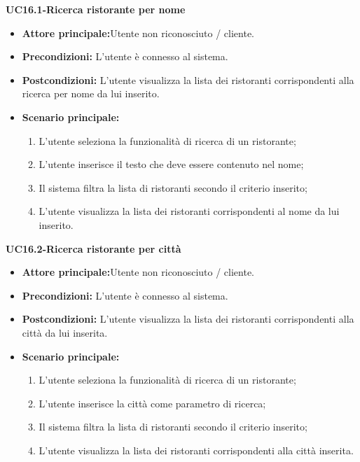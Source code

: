 \textbf{UC16.1-Ricerca ristorante per nome}
\begin{itemize}
\item \textbf{Attore principale:}Utente non riconosciuto / cliente.
\item \textbf{Precondizioni:} L'utente è connesso al sistema.
\item \textbf{Postcondizioni:} L'utente visualizza la lista dei ristoranti corrispondenti
alla ricerca per nome da lui inserito.
\item \textbf{Scenario principale:}
\begin{enumerate}
    \item L'utente seleziona la funzionalità di ricerca di un ristorante;
    \item L'utente inserisce il testo che deve essere contenuto nel nome;
    \item Il sistema filtra la lista di ristoranti secondo il criterio inserito;
    \item L'utente visualizza la lista dei ristoranti corrispondenti al nome da lui inserito.
\end{enumerate}
\end{itemize}

\textbf{UC16.2-Ricerca ristorante per città}
\begin{itemize}
\item \textbf{Attore principale:}Utente non riconosciuto / cliente.
\item \textbf{Precondizioni:} L'utente è connesso al sistema.
\item \textbf{Postcondizioni:} L'utente visualizza la lista dei ristoranti corrispondenti alla città da lui inserita.
\item \textbf{Scenario principale:}
\begin{enumerate}
    \item L'utente seleziona la funzionalità di ricerca di un ristorante;
    \item L'utente inserisce la città come parametro di ricerca;
    \item Il sistema filtra la lista di ristoranti secondo il criterio inserito;
    \item L'utente visualizza la lista dei ristoranti corrispondenti alla città inserita.
\end{enumerate}
\end{itemize}

